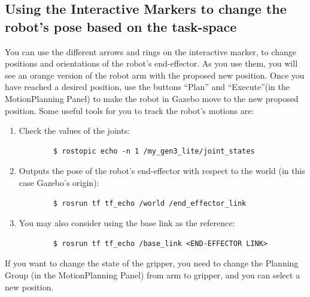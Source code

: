 \documentclass[12pt]{article}
\begin{document}
\subsection{Using the Interactive Markers to change the robot’s pose based on the task-space}


You can use the different arrows and rings on the interactive marker, to change positions and orientations of the robot’s end-effector. As you use them, you will see an orange version of the robot arm with the proposed new position. Once you have reached a desired position, use the buttons “Plan” and “Execute”(in the MotionPlanning Panel) to make the robot in Gazebo move to the new proposed position. Some useful tools for you to track the robot’s motions are:

\begin{enumerate}
    \item Check the values of the joints:
        \begin{verbatim}
        $ rostopic echo -n 1 /my_gen3_lite/joint_states
        \end{verbatim}
    \item Outputs the pose of the robot’s end-effector with respect to the world (in this case Gazebo’s origin):

        \begin{verbatim}
        $ rosrun tf tf_echo /world /end_effector_link
        \end{verbatim}

    \item You may also consider using the base link as the reference:
        \begin{verbatim}
        $ rosrun tf tf_echo /base_link <END-EFFECTOR LINK>
        \end{verbatim}
\end{enumerate}    
If you want to change the state of the gripper, you need to change the Planning Group (in the MotionPlanning Panel) from arm to gripper, and you can select a new position.\\
\end{document}
